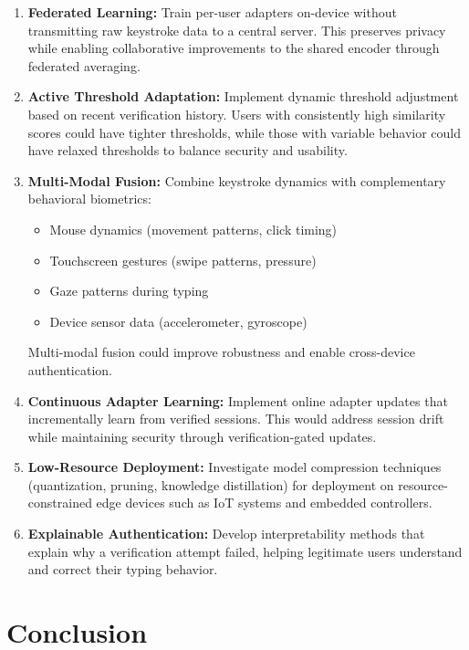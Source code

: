 \documentclass{ieeeaccess}
\begin{document}
{\begin{enumerate}
\item \textbf{Federated Learning:} Train per-user adapters on-device without transmitting raw keystroke data to a central server. This preserves privacy while enabling collaborative improvements to the shared encoder through federated averaging.

\item \textbf{Active Threshold Adaptation:} Implement dynamic threshold adjustment based on recent verification history. Users with consistently high similarity scores could have tighter thresholds, while those with variable behavior could have relaxed thresholds to balance security and usability.

\item \textbf{Multi-Modal Fusion:} Combine keystroke dynamics with complementary behavioral biometrics:
\begin{itemize}
\item Mouse dynamics (movement patterns, click timing)
\item Touchscreen gestures (swipe patterns, pressure)
\item Gaze patterns during typing
\item Device sensor data (accelerometer, gyroscope)
\end{itemize}
Multi-modal fusion could improve robustness and enable cross-device authentication.

\item \textbf{Continuous Adapter Learning:} Implement online adapter updates that incrementally learn from verified sessions. This would address session drift while maintaining security through verification-gated updates.

\item \textbf{Low-Resource Deployment:} Investigate model compression techniques (quantization, pruning, knowledge distillation) for deployment on resource-constrained edge devices such as IoT systems and embedded controllers.

\item \textbf{Explainable Authentication:} Develop interpretability methods that explain why a verification attempt failed, helping legitimate users understand and correct their typing behavior.
\end{enumerate}

\section{Conclusion}
\label{sec:conclusion}

}
\end{document}
